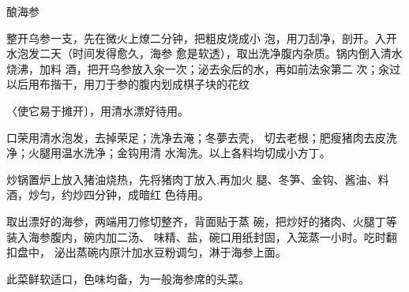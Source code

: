 \begin{recipe}[一品海参]{酿海参}

\ingredients


\cooking

\step 整开乌参一支，先在微火上燎二分钟，把粗皮烧成小 泡，用刀刮净，剖开。入开水泡发二天（时间发得愈久，海参 愈是软透），取出洗净腹内杂质。锅内倒入清水烧沸，加料 酒，把开乌参放入汆一次；泌去汆后的水，再如前法汆第二 次；汆过以后用布揩干，用刀于参的腹内划成棋子块的花纹

〈使它易于摊开〕，用清水漂好待用。

\step 口荣用清水泡发，去掉荣足；洗净去淹；冬夢去壳， 切去老根；肥瘦猪肉去皮洗净；火腿用温水洗净；金钩用清 水淘洗。以上各料均切成小方丁。

\step 炒锅置炉上放入猪油烧热，先将猪肉丁放入,再加火 腿、冬笋、金钩、酱油、料酒，炒匀，约炒四分钟，成暗红 色待用。

取出漂好的海参，两端用刀修切整齐，背面贴于蒸 碗，把炒好的猪肉、火腿丁等装入海参腹内，碗内加二汤、 味精、盐，碗口用纸封固，入笼蒸一小时。吃时翻扣盘中， 泌出蒸碗内原汁加水豆粉调匀，淋于海参上面。

\notes

此菜鲜软适口，色味均备，为一般海参席的头菜。

\end{recipe}

